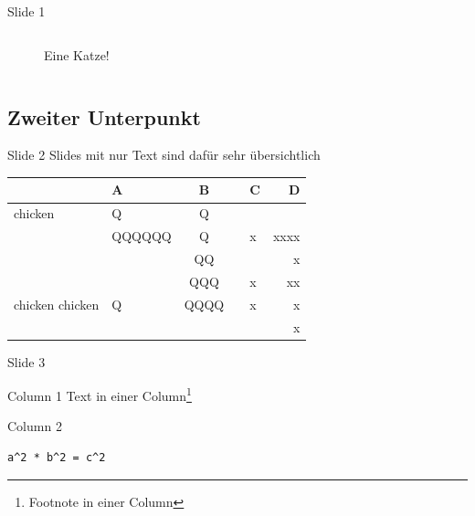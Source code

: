 \documentclass[t,compress,11pt,xcolor=dvipsnames]{beamer}
\begin{document}
\begin{frame}[label=sec-1-1-1]{Slide 1}
\begin{columns}
\begin{column}{0.4\textwidth}
\begin{figure}[htb]
\caption{Eine Katze\footnotemark[2]!}
\end{figure}
\end{column}
\end{columns}
\end{frame}
\subsection{Zweiter Unterpunkt}
\label{sec-1-2}
\begin{frame}[label=sec-1-2-1]{Slide 2}
Slides mit nur Text sind dafür \alert{sehr} übersichtlich

\begin{center}
\begin{tabular}{l|lcl|lr|}
 & A & B &  & C & D\\
\hline
chicken\footnotemark & Q & Q &  &  & \\
 & QQQQQQ & Q &  & x & xxxx\\
 &  & QQ &  &  & x\\
 &  & QQQ &  & x & xx\\
\hline
chicken chicken & Q & QQQQ &  & x & x\\
 &  &  &  &  & x\\
\end{tabular}
\end{center}
\end{frame}

\begin{frame}[fragile,label=sec-1-2-2]{Slide 3}
 \begin{block}{Column 1}
Text in einer Column\footnote{Footnote in einer Column}
\end{block}
\begin{block}{Column 2}
\begin{verbatim}
a^2 * b^2 = c^2
\end{verbatim}
\end{block}
\end{frame}
\end{document}
